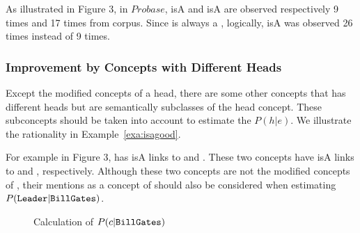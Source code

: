 {\footnotesize
\begin{example}
\label{exa:clc}
As illustrated in Figure 3,
in $Probase$,  isA   and  isA  are observed respectively 9 times and 17 times from corpus. Since  is always a ,  logically,  isA  was observed 26 times instead of 9 times.
\end{example}
}

\subsubsection{Improvement by Concepts with Different Heads}
Except the modified concepts of a head, there are some other concepts that has different heads but  are semantically subclasses of the head concept. These subconcepts should be taken into account to estimate the ${P}(h|e)$.  We illustrate the rationality in Example~\ref{exa:isagood}.

{\footnotesize
\begin{example}
\label{exa:isagood}
For example in Figure 3,
 has isA links to  and . 
These two concepts have isA links to  and , respectively. 
Although these two concepts are not the modified concepts of , their mentions as a concept of   should also be considered when estimating $P(\at{Leader}|\at{Bill Gates})$.
\end{example}
}

\begin{figure}[!tb]
\vspace{-8mm}
\label{fig:bill}
\centering
{}%
\vspace{-4mm}
\caption{Calculation of $P({c}|{\tt Bill Gates})$ }
\vspace{-3mm}
\end{figure}

